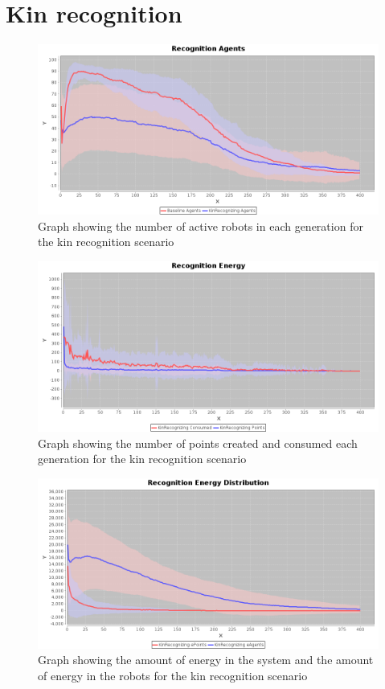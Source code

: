 \documentclass[a4paper]{book}
\begin{document}
\section{Kin recognition}
\label{sec:recog}

\begin{figure}
	\includegraphics[width=\textwidth]{expr2/recognition_agents.png}
    \caption{Graph showing the number of active robots in each generation for the kin recognition scenario}
    \label{fig:agents_recognition}
\end{figure}

\begin{figure}
	\includegraphics[width=\textwidth]{expr2/recognition_energy.png}
    \caption{Graph showing the number of points created and consumed each generation for the kin recognition scenario}
    \label{fig:points_recognition}
\end{figure}

\begin{figure}
\includegraphics[width=\textwidth]{expr2/recognition_distribution.png}
    \caption{Graph showing the amount of energy in the system and the amount of energy in the robots for the kin recognition scenario}
\label{fig:distribution_recognition}
\end{figure}
\end{document}
